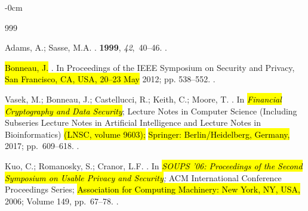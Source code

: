 \documentclass[mathematics,article,accept,pdftex,moreauthors]{Definitions/mdpi}
\begin{document}
\begin{adjustwidth}{-\extralength}{0cm}%
{}

\begin{thebibliography}{999}

Adams, A.; Sasse, M.A.
.
 {\bf 1999}, {\em 42},~40--46.
.

\hl{Bonneau, J.} %
.
\newblock In Proceedings of the IEEE Symposium on Security and Privacy, \hl{San Francisco, CA, USA, 20--23 May }2012;  pp. 538--552. %
.

Vasek, M.; Bonneau, J.; Castellucci, R.; Keith, C.; Moore, T.
.
\newblock In \emph{\hl{Financial Cryptography and Data Security}}; {Lecture Notes in Computer Science (Including Subseries Lecture
  Notes in Artificial Intelligence and Lecture Notes in Bioinformatics)} \hl{(LNSC, volume 9603);} %
   \hl{Springer:  Berlin/Heidelberg, Germany,} 2017;  pp.~609--618. %
.

Kuo, C.; Romanosky, S.; Cranor, L.F.
.
\newblock In \emph{\hl{SOUPS '06: Proceedings of the Second Symposium on Usable Privacy and Security};} {ACM International Conference Proceedings Series}; \hl{Association for Computing Machinery: New York, NY, USA,} {2006}; Volume 149, pp.~67--78.
.


\end{thebibliography}
\end{adjustwidth}
\end{document}

